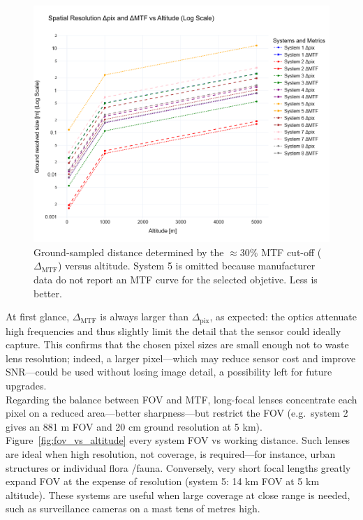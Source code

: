 \begin{figure}[H]
    \centering
    \includegraphics[trim = 0cm 0cm 0cm 2cm, clip, width=0.9\linewidth]{Figures/C2/design_res.png}
    \caption{Ground‐sampled distance determined by the $\approx 30 \%$ MTF
             cut-off (\(\Delta_{\mathrm{MTF}}\)) versus altitude.  System 5
             is omitted because manufacturer data do not report an MTF
             curve for the selected objetive. Less is better.}
    \label{fig:mtf_vs_altitude}
\end{figure}

\noindent At first glance, \(\Delta_{\mathrm{MTF}}\) is always larger than
\(\Delta_{\mathrm{pix}}\), as expected: the optics attenuate high
frequencies and thus slightly limit the detail that the sensor could
ideally capture. This confirms that the chosen pixel sizes are small
enough not to waste lens resolution; indeed, a larger pixel—which may
reduce sensor cost and improve SNR—could be used without losing image
detail, a possibility left for future upgrades.\\


\noindent Regarding the balance between FOV and MTF, long-focal lenses
concentrate each pixel on a reduced area—better sharpness—but restrict
the FOV (e.g.\ system 2 gives an 881 m FOV and 20 cm ground
resolution at 5 km).  Figure~\ref{fig:fov_vs_altitude} every system FOV vs working distance. Such lenses are ideal when high resolution, not coverage, is required—for instance, urban structures or individual
flora /fauna.  Conversely, very short focal lengths greatly expand FOV
at the expense of resolution (system 5: 14 km FOV at 5 km altitude).
These systems are useful when large coverage at close range is needed,
such as surveillance cameras on a mast tens of metres high.\\

